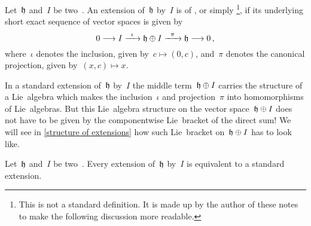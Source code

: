 \begin{definition}
  Let~$\mathfrak{h}$ and~$I$ be two~\liealgebras{$\kf$}.
  An extension of~$\mathfrak{h}$ by~$I$ is of , or simply %
  \footnote{
    This is not a standard definition.
    It is made up by the author of these notes to make the following discussion more readable.
  }, if its underlying short exact sequence of vector spaces is given by
  \[
    0
    \to
    I
    \xto{\iota}
    \hlie \oplus I
    \xto{\pi}
    \hlie
    \to
    0 \,,
  \]
  where~$\iota$ denotes the inclusion, given by~$c \mapsto (0,c)$, and~$\pi$ denotes the canonical projection, given by~$(x,c) \mapsto x$.
\end{definition}


\begin{warning}
  In a standard extension of~$\mathfrak{h}$ by~$I$ the middle term~$\mathfrak{h} \oplus I$ carries the structure of a Lie~algebra which makes the inclusion~$\iota$ and projection~$\pi$ into homomorphisms of Lie~algebras.
  But this Lie~algebra structure on the vector space~$\mathfrak{h} \oplus I$ does not have to be given by the componentwise Lie~bracket of the direct sum!
  We will see in \cref{structure of extensions} how such Lie~bracket on~$\mathfrak{h} \oplus I$ has to look like.
\end{warning}


\begin{proposition}
  \label{every extension is equivalent to a standard one}
  Let~$\mathfrak{h}$ and~$I$ be two~\liealgebras{$\kf$}.
  Every extension of~$\mathfrak{h}$ by~$I$ is equivalent to a standard extension.
\end{proposition}


